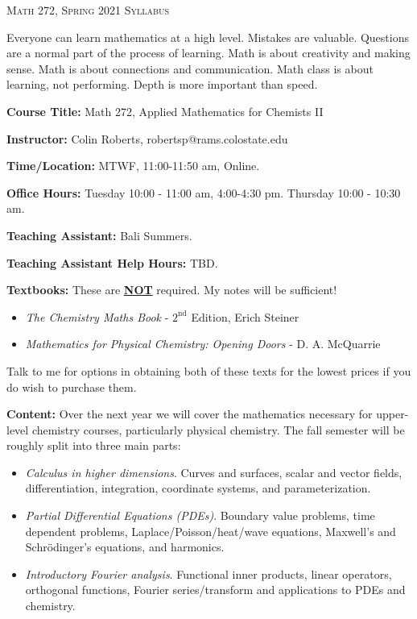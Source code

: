 \documentclass[12pt]{amsbook}
\begin{document}

\SetWatermarkText{
\begin{minipage}[c][8cm]{8cm}
\begin{center}
 
\end{center}
\end{minipage}
}




\begin{center}
   \textsc{\large Math 272, Spring 2021 Syllabus}
\end{center}
\vspace{.5cm}

Everyone can learn mathematics at a high level.
Mistakes are valuable.
Questions are a normal part of the process of learning.
Math is about creativity and making sense.
Math is about connections and communication.
Math class is about learning, not performing.
Depth is more important than speed.

\textbf{Course Title:} Math 272, Applied Mathematics for Chemists II

\textbf{Instructor:} Colin Roberts, robertsp@rams.colostate.edu

\textbf{Time/Location:} MTWF, 11:00-11:50 am, Online.  

\textbf{Office Hours:} Tuesday 10:00 - 11:00 am, 4:00-4:30 pm. Thursday 10:00 - 10:30 am.

\textbf{Teaching Assistant:} Bali Summers.

\textbf{Teaching Assistant Help Hours:} TBD.

\textbf{Textbooks:} These are \underline{\textbf{NOT}} required.  My notes will be sufficient!
\begin{itemize}
    \item \emph{The Chemistry Maths Book} - $2^{\text{nd}}$ Edition, Erich Steiner
    \item \emph{Mathematics for Physical Chemistry: Opening Doors} - D. A. McQuarrie
\end{itemize}
Talk to me for options in obtaining both of these texts for the lowest prices if you do wish to purchase them. 

\textbf{Content:} Over the next year we will cover the mathematics necessary for upper-level chemistry courses, particularly physical chemistry. The fall semester will be roughly split into three main parts:
\begin{itemize}
    \item \emph{Calculus in higher dimensions}. Curves and surfaces, scalar and vector fields, differentiation, integration, coordinate systems, and parameterization.
    \item \emph{Partial Differential Equations (PDEs)}. Boundary value problems, time dependent problems, Laplace/Poisson/heat/wave equations, Maxwell's and Schr\"odinger's equations, and harmonics.
    \item \emph{Introductory Fourier analysis}. Functional inner products, linear operators, orthogonal functions, Fourier series/transform and applications to PDEs and chemistry.
\end{itemize}
\end{document}
